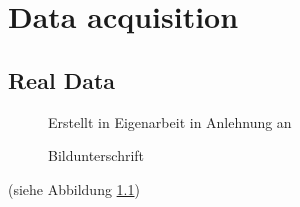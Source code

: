 \chapter{Data acquisition}

    \section{Real Data}
    \begin{figure}[H]
        \centering
        \caption{Bildunterschrift}
        \label{soqu2}
        \small{Erstellt in Eigenarbeit in Anlehnung an \cite[see][]{us2020}}
    \end{figure}
    \blindtext (siehe Abbildung \ref{soqu2})

